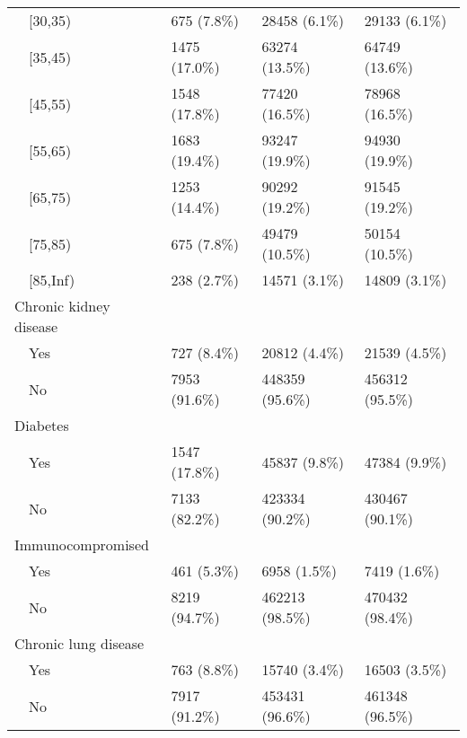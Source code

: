 \begin{table}[ht]
\begin{tabular}{llll}
    [30,35) & 675 (7.8\%) & 28458 (6.1\%) & 29133 (6.1\%) \\ 
    [35,45) & 1475 (17.0\%) & 63274 (13.5\%) & 64749 (13.6\%) \\ 
    [45,55) & 1548 (17.8\%) & 77420 (16.5\%) & 78968 (16.5\%) \\ 
    [55,65) & 1683 (19.4\%) & 93247 (19.9\%) & 94930 (19.9\%) \\ 
    [65,75) & 1253 (14.4\%) & 90292 (19.2\%) & 91545 (19.2\%) \\ 
    [75,85) & 675 (7.8\%) & 49479 (10.5\%) & 50154 (10.5\%) \\ 
    [85,Inf) & 238 (2.7\%) & 14571 (3.1\%) & 14809 (3.1\%) \\ 
  Chronic kidney disease &  &  &  \\ 
    Yes & 727 (8.4\%) & 20812 (4.4\%) & 21539 (4.5\%) \\ 
    No & 7953 (91.6\%) & 448359 (95.6\%) & 456312 (95.5\%) \\ 
  Diabetes &  &  &  \\ 
    Yes & 1547 (17.8\%) & 45837 (9.8\%) & 47384 (9.9\%) \\ 
    No & 7133 (82.2\%) & 423334 (90.2\%) & 430467 (90.1\%) \\ 
  Immunocompromised &  &  &  \\ 
    Yes & 461 (5.3\%) & 6958 (1.5\%) & 7419 (1.6\%) \\ 
    No & 8219 (94.7\%) & 462213 (98.5\%) & 470432 (98.4\%) \\ 
  Chronic lung disease &  &  &  \\ 
    Yes & 763 (8.8\%) & 15740 (3.4\%) & 16503 (3.5\%) \\ 
    No & 7917 (91.2\%) & 453431 (96.6\%) & 461348 (96.5\%) \\ 
   \hline
\end{tabular}
\end{table}
